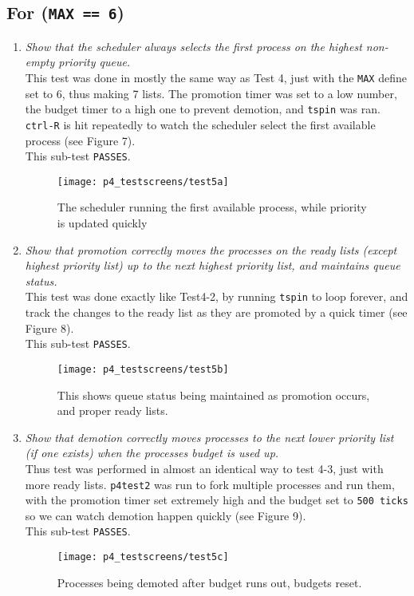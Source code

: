 \documentclass[11pt,letterpaper]{report}
\begin{document}
	\subsection{For ({\tt MAX == 6})}
	
	\begin{enumerate}
		\item \emph{Show that the scheduler always selects the first process on the highest non-empty priority queue.}\\
		This test was done in mostly the same way as Test 4, just with the {\tt MAX} define set to 6, thus making 7 lists. The promotion timer was set to a low number, the budget timer to a high one to prevent demotion, and {\tt tspin} was ran. {\tt ctrl-R} is hit repeatedly to watch the scheduler select the first available process (see {\color{red} Figure 7}).\\
		This sub-test {\tt PASSES}.
\begin{figure}
	\centering
	\texttt{[image: p4\_testscreens/test5a]}
	\caption{The scheduler running the first available process, while priority is updated quickly}
	\label{fig:test5a}
\end{figure}
		
		\item \emph{Show that promotion correctly moves the processes on the ready lists (except highest priority list) up to the next highest priority list, and maintains queue status.}\\
		This test was done exactly like Test4-2, by running {\tt tspin} to loop forever, and track the changes to the ready list as they are promoted by a quick timer (see {\color{red}Figure 8}).\\
		This sub-test {\tt PASSES}.
\begin{figure}
	\centering
	\texttt{[image: p4\_testscreens/test5b]}
	\caption{This shows queue status being maintained as promotion occurs, and proper ready lists.}
	\label{fig:test5b}
\end{figure}
		
		\item \emph{Show that demotion correctly moves processes to the next lower priority list (if one exists) when the processes budget is used up.}\\
		Thus test was performed in almost an identical way to test 4-3, just with more ready lists. {\tt p4test2} was run to fork multiple processes and run them, with the promotion timer set extremely high and the budget set to {\tt 500 ticks} so we can watch demotion happen quickly (see {\color{red} Figure 9}).\\
		This sub-test {\tt PASSES}.
\begin{figure}
	\centering
	\texttt{[image: p4\_testscreens/test5c]}
	\caption{Processes being demoted after budget runs out, budgets reset.}
	\label{fig:test5c}
\end{figure}
	\end{enumerate}	
\end{document}
